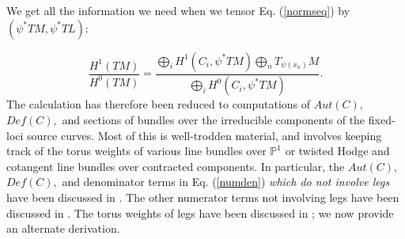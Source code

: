 \documentclass[a4paper,11pt]{article}
\newcommand{\PP}{{\mathbb{P}}}
\begin{document}
We get all the information we need when we tensor
Eq.\!\! (\ref{normseq}) by $(\psi^*TM,\psi^*TL):$

\begin{equation}
\label{honehzero}
\frac{H^1(TM)}{H^0(TM)} =
\frac{\bigoplus_i H^1(C_i,\psi^*TM)
\bigoplus_n T_{\psi(x_n)}M}{\bigoplus_i H^0(C_i,\psi^*TM)}.
\end{equation}
The calculation has therefore been reduced to computations
of $Aut(C),$ $Def(C),$ and
sections of bundles
over the irreducible components of the fixed-loci
source curves.  Most of this is well-trodden material,
and involves keeping track of the torus weights
of various line bundles over $\PP^1$ or twisted
Hodge and cotangent line
bundles over contracted components.
In particular, the $Aut(C),$ $Def(C),$
and denominator terms
in
Eq.\!\!\! (\ref{numden})
{\em which do not involve legs}
have been
discussed in \cite{GP}.
The other numerator terms not involving legs have
been discussed in \cite{KZ}.
The torus weights of legs
have been discussed in \cite{KL};
we now provide an alternate derivation.
\end{document}
